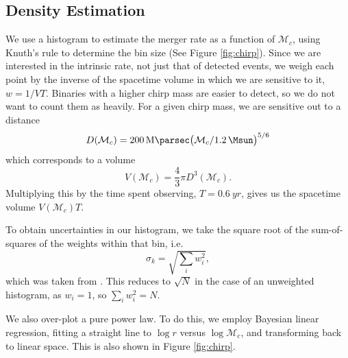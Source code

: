 \subsection{Density Estimation}
\label{sec:density}

We use a histogram to estimate the merger rate as a function of $\mathcal{M}_c$, using Knuth's rule to determine the bin size (See Figure \ref{fig:chirp}). Since we are interested in the intrinsic rate, not just that of detected events, we weigh each point by the inverse of the spacetime volume in which we are sensitive to it, $w = 1 / VT$. Binaries with a higher chirp mass are easier to detect, so we do not want to count them as heavily. For a given chirp mass, we are sensitive out to a distance
%
\begin{equation}
  D(\mathcal{M}_c) =
  \SI{200}{\mega\parsec} \qty( \mathcal{M}_c / \SI{1.2}{\Msun} )^{5/6}
\end{equation}
%
which corresponds to a volume
%
\begin{equation}
  V(\mathcal{M}_c) = \frac{4}{3} \pi D^3(\mathcal{M}_c).
\end{equation}
%
Multiplying this by the time spent observing, $T = \SI{0.6}{yr}$, gives us the spacetime volume $V(\mathcal{M}_c) T$.

To obtain uncertainties in our histogram, we take the square root of the sum-of-squares of the weights within that bin, i.e.
%
\begin{equation}
  \sigma_k = \sqrt{\sum_i w_i^2},
\end{equation}
%
which was taken from \textcite{weighted-hist}. This reduces to $\sqrt{N}$ in the case of an unweighted histogram, as $w_i = 1$, so $\sum_i w_i^2 = N$.

We also over-plot a pure power law. To do this, we employ Bayesian linear regression, fitting a straight line to $\log r$ versus $\log \mathcal{M}_c$, and transforming back to linear space. This is also shown in Figure \ref{fig:chirp}.


